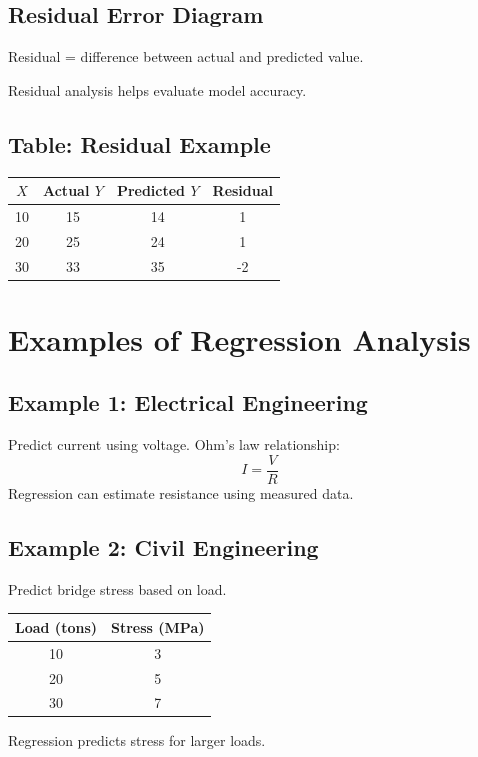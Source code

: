 \documentclass[12pt,a4paper]{article}
\begin{document}
	\subsection{Residual Error Diagram}
	Residual = difference between actual and predicted value.
	
	\begin{center}
	\end{center}
	
	Residual analysis helps evaluate model accuracy.
	
	\subsection{Table: Residual Example}
	\begin{table}[h!]
		\centering
		\begin{tabular}{|c|c|c|c|}
			\hline
			$X$ & Actual $Y$ & Predicted $Y$ & Residual \\
			\hline
			10 & 15 & 14 & 1 \\
			20 & 25 & 24 & 1 \\
			30 & 33 & 35 & -2 \\
			\hline
		\end{tabular}
	\end{table}
	
	\section{Examples of Regression Analysis}
	
	\subsection{Example 1: Electrical Engineering}
	Predict current using voltage. Ohm's law relationship:
	\[
	I = \frac{V}{R}
	\]
	Regression can estimate resistance using measured data.
	
	\subsection{Example 2: Civil Engineering}
	Predict bridge stress based on load.
	\begin{table}[h!]
		\centering
		\begin{tabular}{|c|c|}
			\hline
			\textbf{Load (tons)} & \textbf{Stress (MPa)} \\
			\hline
			10 & 3 \\
			20 & 5 \\
			30 & 7 \\
			\hline
		\end{tabular}
	\end{table}
	Regression predicts stress for larger loads.
	
\end{document}

